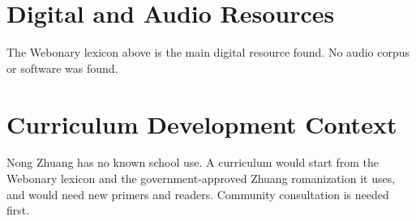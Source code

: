 \documentclass[12pt]{article}
\begin{document}
\section{Digital and Audio Resources}
The Webonary lexicon above is the main digital resource found. No audio corpus or software was found.

\section{Curriculum Development Context}
Nong Zhuang has no known school use. A curriculum would start from the Webonary lexicon and the government-approved Zhuang romanization it uses, and would need new primers and readers. Community consultation is needed first.
\end{document}
